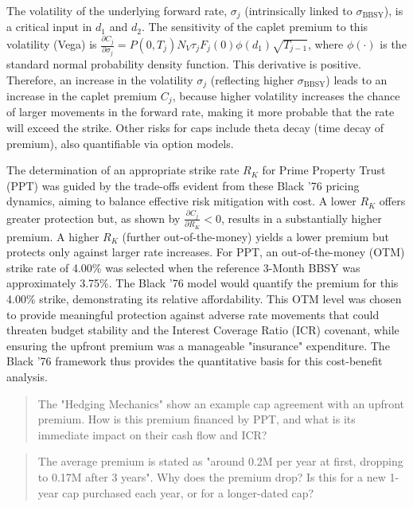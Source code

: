 \documentclass[11pt, a4paper, british]{article}
\begin{document}
The volatility of the underlying forward rate, $\sigma_j$ (intrinsically linked to $\sigma_{\text{BBSY}}$), is a critical input in $d_1$ and $d_2$. The sensitivity of the caplet premium to this volatility (Vega) is $\frac{\partial C_j}{\partial \sigma_j} = P(0, T_j) N_V \tau_j F_j(0) \phi(d_1) \sqrt{T_{j-1}}$, where $\phi(\cdot)$ is the standard normal probability density function. This derivative is positive. Therefore, an increase in the volatility $\sigma_j$ (reflecting higher $\sigma_{\text{BBSY}}$) leads to an increase in the caplet premium $C_j$, because higher volatility increases the chance of larger movements in the forward rate, making it more probable that the rate will exceed the strike. Other risks for caps include theta decay (time decay of premium), also quantifiable via option models.

The determination of an appropriate strike rate $R_K$ for Prime Property Trust (PPT) was guided by the trade-offs evident from these Black '76 pricing dynamics, aiming to balance effective risk mitigation with cost. A lower $R_K$ offers greater protection but, as shown by $\frac{\partial C_j}{\partial R_K} < 0$, results in a substantially higher premium. A higher $R_K$ (further out-of-the-money) yields a lower premium but protects only against larger rate increases. For PPT, an out-of-the-money (OTM) strike rate of 4.00\% was selected when the reference 3-Month BBSY was approximately 3.75\%. The Black '76 model would quantify the premium for this 4.00\% strike, demonstrating its relative affordability. This OTM level was chosen to provide meaningful protection against adverse rate movements that could threaten budget stability and the Interest Coverage Ratio (ICR) covenant, while ensuring the upfront premium was a manageable "insurance" expenditure. The Black '76 framework thus provides the quantitative basis for this cost-benefit analysis.


\newpage

\begin{quote}
    The "Hedging Mechanics" show an example cap agreement with an upfront premium. How is this premium financed by PPT, and what is its immediate impact on their cash flow and ICR?
\end{quote}

\newpage

\begin{quote}
    The average premium is stated as "around 0.2M per year at first, dropping to 0.17M after 3 years". Why does the premium drop? Is this for a new 1-year cap purchased each year, or for a longer-dated cap?
\end{quote}
\end{document}

